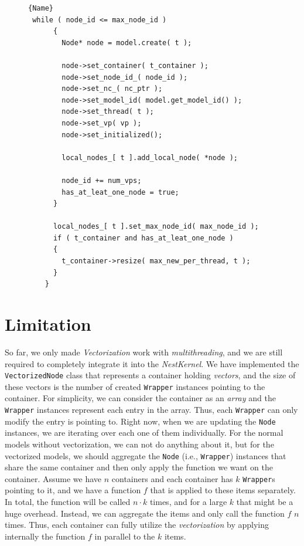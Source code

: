 \begin{figure}
\begin{lstlisting}[caption=Creating nodes,frame=tlrb, label=lst:creating_nodes_while]{Name}
 while ( node_id <= max_node_id )
      {
        Node* node = model.create( t );

        node->set_container( t_container );
        node->set_node_id_( node_id );
        node->set_nc_( nc_ptr );
        node->set_model_id( model.get_model_id() );
        node->set_thread( t );
        node->set_vp( vp );
        node->set_initialized();

        local_nodes_[ t ].add_local_node( *node );

        node_id += num_vps;
        has_at_leat_one_node = true;
      }

      local_nodes_[ t ].set_max_node_id( max_node_id );
      if ( t_container and has_at_leat_one_node )
      {
        t_container->resize( max_new_per_thread, t );
      }
    }
\end{lstlisting}
\end{figure}

\section{Limitation}

So far, we only made \emph{Vectorization} work with \emph{multithreading}, and we are still required to completely integrate it into the \emph{NestKernel}. We have implemented the \texttt{VectorizedNode} class that represents a container holding  \emph{vectors}, and the size of these vectors is the number of created \texttt{Wrapper} instances pointing to the container. For simplicity, we can consider the container as an \emph{array} and the \texttt{Wrapper} instances represent each entry in the array. Thus, each \texttt{Wrapper} can only modify the entry is pointing to. Right now, when we are updating the \texttt{Node} instances, we are iterating over each one of them individually. For the normal models without vectorization, we can not do anything about it, but for the vectorized models, we should aggregate the \texttt{Node} (i.e., \texttt{Wrapper}) instances that share the same container and then only apply the function we want on the container. Assume we have $n$ containers and each container has $k$ \texttt{Wrapper}s pointing to it, and we have a function $f$ that is applied to these items separately. In total, the function will be called $n\cdot k$ times, and for a large $k$ that might be a huge overhead. Instead, we can aggregate the items and only call the function $f$ $n$ times. Thus, each container can fully utilize the \emph{vectorization} by applying internally the function $f$ in parallel to the $k$ items.


